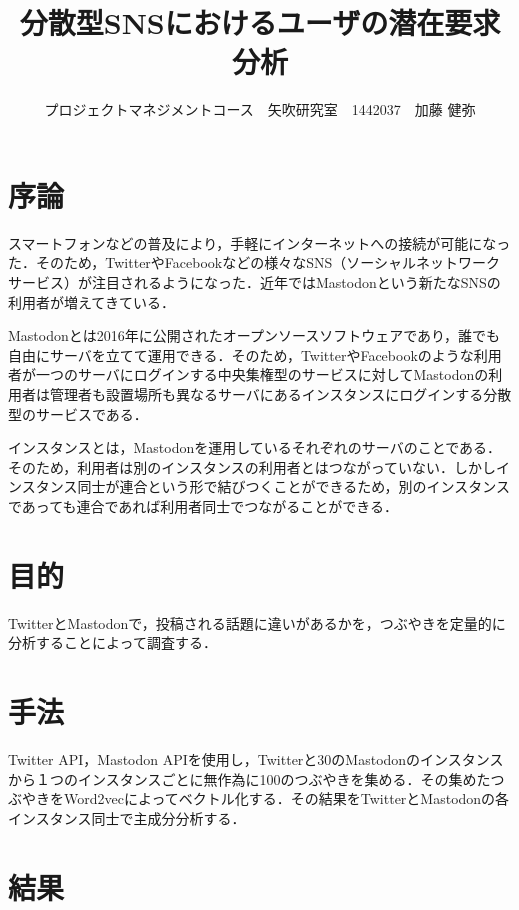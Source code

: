 \documentclass[uplatex,twocolumn,dvipdfmx]{jsarticle}
\title{\vspace{-5mm}\fontsize{14pt}{0pt}\selectfont 分散型SNSにおけるユーザの潜在要求分析}
\author{\normalsize プロジェクトマネジメントコース　矢吹研究室　1442037　加藤 健弥}
\date{}
\begin{document}
\fontsize{10.5pt}{\baselineskip}\selectfont
\maketitle





\section{序論}\label{序論}
スマートフォンなどの普及により，手軽にインターネットへの接続が可能になった．そのため，TwitterやFacebookなどの様々なSNS（ソーシャルネットワークサービス）が注目されるようになった．近年ではMastodonという新たなSNSの利用者が増えてきている．

Mastodonとは2016年に公開されたオープンソースソフトウェアであり，誰でも自由にサーバを立てて運用できる．そのため，TwitterやFacebookのような利用者が一つのサーバにログインする中央集権型のサービスに対してMastodonの利用者は管理者も設置場所も異なるサーバにあるインスタンスにログインする分散型のサービスである．

インスタンスとは，Mastodonを運用しているそれぞれのサーバのことである．そのため，利用者は別のインスタンスの利用者とはつながっていない．しかしインスタンス同士が連合という形で結びつくことができるため，別のインスタンスであっても連合であれば利用者同士でつながることができる\cite{Mastodon}．




\section{目的}

TwitterとMastodonで，投稿される話題に違いがあるかを，つぶやきを定量的に分析することによって調査する．

\section{手法}

Twitter API，Mastodon APIを使用し，Twitterと30のMastodonのインスタンスから１つのインスタンスごとに無作為に100のつぶやきを集める．その集めたつぶやきをWord2vecによってベクトル化する．その結果をTwitterとMastodonの各インスタンス同士で主成分分析する．


\section{結果}
\end{document}
